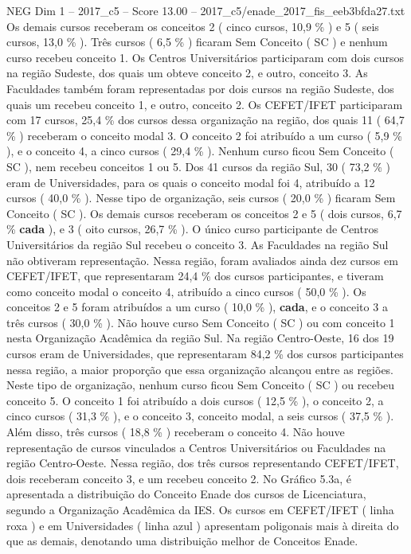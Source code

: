 \begin{textsample}{NEG Dim 1 – 2017\_c5 – Score 13.00 – 2017\_c5/enade\_2017\_fis\_eeb3bfda27.txt}
Os demais cursos receberam os conceitos 2 ( cinco cursos, 10,9 \% ) e 5 ( seis cursos, 13,0 \% ).
Três cursos ( 6,5 \% ) ficaram Sem Conceito ( SC ) e nenhum curso recebeu conceito 1.
Os Centros Universitários participaram com dois cursos na região Sudeste, dos quais um obteve conceito 2, e outro, conceito 3.
As Faculdades também foram representadas por dois cursos na região Sudeste, dos quais um recebeu conceito 1, e outro, conceito 2.
Os CEFET/IFET participaram com 17 cursos, 25,4 \% dos cursos dessa organização na região, dos quais 11 ( 64,7 \% ) receberam o conceito modal 3.
O conceito 2 foi atribuído a um curso ( 5,9 \% ), e o conceito 4, a cinco cursos ( 29,4 \% ).
Nenhum curso ficou Sem Conceito ( SC ), nem recebeu conceitos 1 ou 5.
Dos 41 cursos da região Sul, 30 ( 73,2 \% ) eram de Universidades, para os quais o conceito modal foi 4, atribuído a 12 cursos ( 40,0 \% ).
Nesse tipo de organização, seis cursos ( 20,0 \% ) ficaram Sem Conceito ( SC ).
Os demais cursos receberam os conceitos 2 e 5 ( dois cursos, 6,7 \% \textbf{cada} ), e 3 ( oito cursos, 26,7 \% ).
O único curso participante de Centros Universitários da região Sul recebeu o conceito 3.
As Faculdades na região Sul não obtiveram representação.
Nessa região, foram avaliados ainda dez cursos em CEFET/IFET, que representaram 24,4 \% dos cursos participantes, e tiveram como conceito modal o conceito 4, atribuído a cinco cursos ( 50,0 \% ).
Os conceitos 2 e 5 foram atribuídos a um curso ( 10,0 \% ), \textbf{cada}, e o conceito 3 a três cursos ( 30,0 \% ).
Não houve curso Sem Conceito ( SC ) ou com conceito 1 nesta Organização Acadêmica da região Sul.
Na região Centro-Oeste, 16 dos 19 cursos eram de Universidades, que representaram 84,2 \% dos cursos participantes nessa região, a maior proporção que essa organização alcançou entre as regiões.
Neste tipo de organização, nenhum curso ficou Sem Conceito ( SC ) ou recebeu conceito 5.
O conceito 1 foi atribuído a dois cursos ( 12,5 \% ), o conceito 2, a cinco cursos ( 31,3 \% ), e o conceito 3, conceito modal, a seis cursos ( 37,5 \% ).
Além disso, três cursos ( 18,8 \% ) receberam o conceito 4.
Não houve representação de cursos vinculados a Centros Universitários ou Faculdades na região Centro-Oeste.
Nessa região, dos três cursos representando CEFET/IFET, dois receberam conceito 3, e um recebeu conceito 2.
No Gráfico 5.3a, é apresentada a distribuição do Conceito Enade dos cursos de Licenciatura, segundo a Organização Acadêmica da IES.
Os cursos em CEFET/IFET ( linha roxa ) e em Universidades ( linha azul ) apresentam poligonais mais à direita do que as demais, denotando uma distribuição melhor de Conceitos Enade.

\end{textsample}
